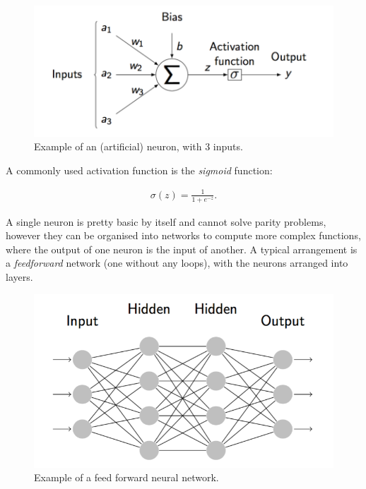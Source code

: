 \documentclass[12pt,twoside,notitlepage]{report}
\begin{document}
                \begin{figure}
                    \centering
                    \includegraphics[scale=0.5]{neuron}
                    \caption{Example of an (artificial) neuron, with 3 inputs.}
                    \label{fig:neuron}
                \end{figure}

                A commonly used activation function is the \textit{sigmoid} function:

                \begin{align}
                    \sigma(z) = \frac{1}{1+e^{-z}}.
                \end{align}

                A single neuron is pretty basic by itself and cannot solve parity problems, however they can be organised into 
                networks to compute more complex functions, where the output of one neuron is the input of another. A typical 
                arrangement is a \textit{feedforward} network (one without any loops), with the neurons arranged into layers. 

                \begin{figure}
                    \centering
                    \includegraphics[scale=0.5]{neuralnetwork}
                    \caption{Example of a feed forward neural network.}
                    \label{fig:neuron}
                \end{figure}
\end{document}
